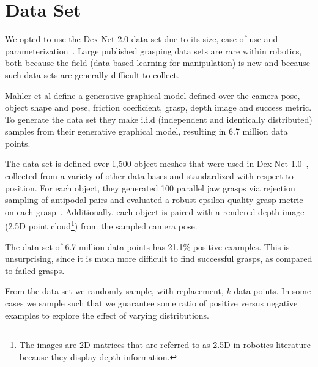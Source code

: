 
\section{Data Set}
\label{sec:data_set}

We opted to use the Dex Net 2.0 data set due to its size, ease of use and parameterization~\cite{mahler2017dex}. 
Large published grasping data sets are rare within robotics, both because the field (data based learning for manipulation) is new and because such data sets are generally difficult to collect. 

Mahler et al define a generative graphical model defined over the camera pose, object shape and pose, friction coefficient, grasp, depth image and success metric. 
To generate the data set they make i.i.d (independent and identically distributed) samples from their generative graphical model, resulting in 6.7 million data points. 

The data set is defined over 1,500 object meshes that were used in Dex-Net 1.0~\cite{mahler2016dex}, collected from a variety of other data bases and standardized with respect to position.
For each object, they generated 100 parallel jaw grasps via rejection sampling of antipodal pairs and evaluated a robust epsilon quality grasp metric on each grasp~\cite{seita2016large}. 
Additionally, each object is paired with a rendered depth image (2.5D point cloud\footnote{The images are 2D matrices that are referred to as 2.5D in robotics literature because they display depth information.}) from the sampled camera pose. 

The data set of 6.7 million data points has 21.1\% positive examples. 
This is unsurprising, since it is much more difficult to find successful grasps, as compared to failed grasps. 

From the data set we randomly sample, with replacement, $k$ data points. 
In some cases we sample such that we guarantee some ratio of positive versus negative examples to explore the effect of varying distributions.  